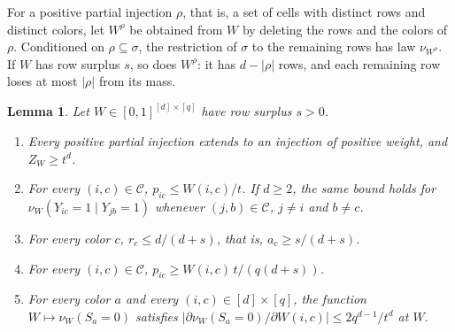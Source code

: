 \documentclass{amsart}
\numberwithin{equation}{section}
\theoremstyle{plain}
\newtheorem{lemma}[theorem]{Lemma}
\theoremstyle{definition}
\theoremstyle{remark}
\newcommand{\cC}{\mathcal{C}}
\begin{document}
For a positive partial injection $\rho$, that is, a set of cells with distinct rows and distinct colors, let $W^\rho$ be obtained from $W$ by deleting the rows and the colors of $\rho$. Conditioned on $\rho\subseteq\sigma$, the restriction of $\sigma$ to the remaining rows has law $\nu_{W^\rho}$. If $W$ has row surplus $s$, so does $W^\rho$: it has $d-|\rho|$ rows, and each remaining row loses at most $|\rho|$ from its mass.

\begin{lemma}\label{lem:basic}
Let $W\in[0,1]^{[d]\times[q]}$ have row surplus $s>0$.
\begin{enumerate}
\item[(i)] Every positive partial injection extends to an injection of positive weight, and $Z_W\ge t^d$.
\item[(ii)] For every $(i,c)\in\cC$, $p_{ic}\le W(i,c)/t$. If $d\ge2$, the same bound holds for $\nu_W(Y_{ic}=1\mid Y_{jb}=1)$ whenever $(j,b)\in\cC$, $j\ne i$ and $b\ne c$.
\item[(iii)] For every color $c$, $r_c\le d/(d+s)$, that is, $a_c\ge s/(d+s)$.
\item[(iv)] For every $(i,c)\in\cC$, $p_{ic}\ge W(i,c)\,t/(q(d+s))$.
\item[(v)] For every color $a$ and every $(i,c)\in[d]\times[q]$, the function $W\mapsto\nu_W(S_a=0)$ satisfies $|\partial\nu_W(S_a=0)/\partial W(i,c)|\le2q^{d-1}/t^d$ at $W$.
\end{enumerate}
\end{lemma}
\end{document}
